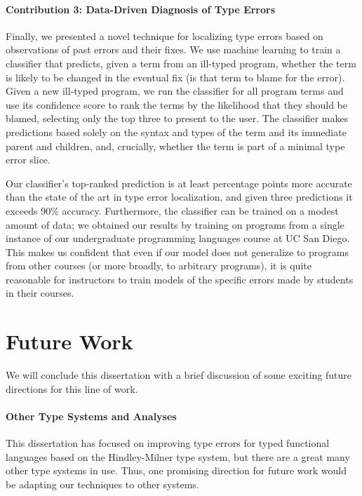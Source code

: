 \paragraph{Contribution 3: Data-Driven Diagnosis of Type Errors}
Finally, we presented a novel technique for localizing type errors based
on observations of past errors and their fixes.
%
We use machine learning to train a classifier that predicts, given a
term from an ill-typed program, whether the term is likely to be changed
in the eventual fix (\ie is that term to blame for the error).
%
Given a new ill-typed program, we run the classifier for all program
terms and use its confidence score to rank the terms by the likelihood
that they should be blamed, selecting only the top three to present to
the user.
%
The classifier makes predictions based solely on the syntax and types of
the term and its immediate parent and children, and, crucially, whether
the term is part of a minimal type error slice.

Our classifier's top-ranked prediction is at least \ToolnameWinSherrloc
percentage points more accurate than the state of the art in type error
localization, and given three predictions it exceeds 90\% accuracy.
%
Furthermore, the classifier can be trained on a modest amount of data;
we obtained our results by training on programs from a single instance
of our undergraduate programming languages course at UC San Diego.
%
This makes us confident that even if our model does not generalize to
programs from other courses (or more broadly, to arbitrary \ocaml
programs), it is quite reasonable for instructors to train models of the
specific errors made by students in their courses.


\section{Future Work}
\label{sec:conc:future-work}
We will conclude this dissertation with a brief discussion of some
exciting future directions for this line of work.

\paragraph{Other Type Systems and Analyses}
This dissertation has focused on improving type errors for typed
functional languages based on the Hindley-Milner type system, but
there are a great many other type systems in use.
%
Thus, one promising direction for future work would be adapting our
techniques to other systems.


